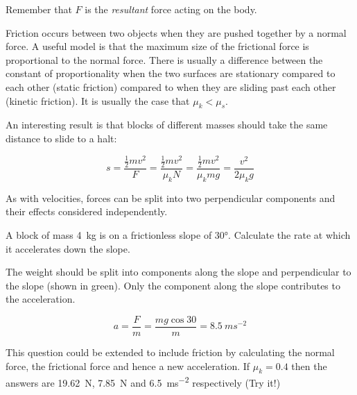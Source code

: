 \documentclass[main.tex]{subfiles}
\begin{document}

Remember that $F$ is the \emph{resultant} force acting on the body.



Friction occurs between two objects when they are pushed together by a normal force. A useful model is that the maximum size of the frictional force is proportional to the normal force. There is usually a difference between the constant of proportionality when the two surfaces are stationary compared to each other (static friction) compared to when they are sliding past each other (kinetic friction). It is usually the case that $\mu_k < \mu_s$.

An interesting result is that blocks of different masses should take the same distance to slide to a halt:

\[ s = \frac{\frac{1}{2}mv^2}{F} = \frac{\frac{1}{2}mv^2}{\mu_k N} = \frac{\frac{1}{2}mv^2}{\mu_k mg} = \frac{v^2}{2\mu_k g} \]


As with velocities, forces can be split into two perpendicular components and their effects considered independently.

\begin{example}
A block of mass \SI{4}{kg} is on a frictionless slope of \ang{30}. Calculate the rate at which it accelerates down the slope.


\answer

The weight should be split into components along the slope and perpendicular to the slope (shown in green). Only the component along the slope contributes to the acceleration.

\[ a = \frac{F}{m} = \frac{mg\cos{30}}{m} = \SI{8.5}{ms^{-2}} \]

This question could be extended to include friction by calculating the normal force, the frictional force and hence a new acceleration. If $\mu_k = 0.4$ then the answers are \SI{19.62}{N}, \SI{7.85}{N} and \SI{6.5}{ms^{-2}} respectively (Try it!)

\end{example}
\end{document}
